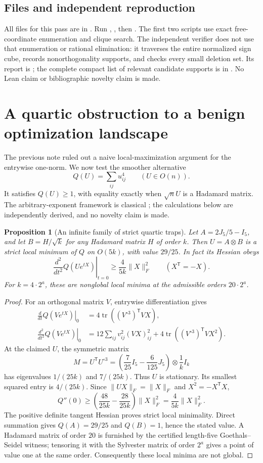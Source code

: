 \documentclass[11pt]{article}
\newtheorem{proposition}{Proposition}[section]
\begin{document}
\subsection{Files and independent reproduction}
All files for this pass are in .
Run , , then .
The first two scripts use exact free-coordinate enumeration and clique
search. The independent verifier does not use that enumeration or
rational elimination: it traverses the entire normalized sign cube,
records nonorthogonality supports, and checks every small deletion set.
Its report is ; the complete compact list of
relevant candidate supports is in .
No Lean claim or bibliographic novelty claim is made.
\section{A quartic obstruction to a benign optimization landscape}
The previous note ruled out a naive local-maximization argument for
the entrywise one-norm. We now test the smoother alternative
\[
 Q(U)=\sum_{ij}u_{ij}^4\qquad(U\in O(n)).
\]
It satisfies $Q(U)\ge1$, with equality exactly when $\sqrt nU$ is a
Hadamard matrix. The arbitrary-exponent framework is classical
\cite{ArbitraryP}; the calculations below are independently derived,
and no novelty claim is made.

\begin{proposition}[An infinite family of strict quartic traps]
Let $A=2J_5/5-I_5$, and let $B=H/\sqrt k$ for any Hadamard matrix
$H$ of order $k$. Then $U=A\otimes B$ is a strict local minimum of
$Q$ on $O(5k)$, with value $29/25$. In fact its Hessian obeys
\[
 \left.\frac{d^2}{dt^2}Q(Ue^{tX})\right|_{t=0}
 \ge\frac4{5k}\|X\|_F^2
 \qquad(X^{\mathsf T}=-X).
\]
For $k=4\cdot2^a$, these are nonglobal local minima at the admissible
orders $20\cdot2^a$.
\end{proposition}
\begin{proof}
For an orthogonal matrix $V$, entrywise differentiation gives
\begin{align*}
 \left.\frac{d}{dt}Q(Ve^{tX})\right|_{0}
 &=4\operatorname{tr}((V^{\circ3})^{\mathsf T}VX),\\
 \left.\frac{d^2}{dt^2}Q(Ve^{tX})\right|_{0}
 &=12\sum_{ij}v_{ij}^2(VX)_{ij}^2
   +4\operatorname{tr}((V^{\circ3})^{\mathsf T}VX^2).
\end{align*}
At the claimed $U$, the symmetric matrix
\[
 M=U^{\mathsf T}U^{\circ3}
  =\left(\frac7{25}I_5-\frac6{125}J_5\right)\otimes\frac1kI_k
\]
has eigenvalues $1/(25k)$ and $7/(25k)$. Thus $U$ is stationary.
Its smallest squared entry is $4/(25k)$. Since
$\|UX\|_F=\|X\|_F$ and $X^2=-X^{\mathsf T}X$,
\[
 Q''(0)\ge\left(\frac{48}{25k}-\frac{28}{25k}\right)\|X\|_F^2
 =\frac4{5k}\|X\|_F^2.
\]
The positive definite tangent Hessian proves strict local minimality.
Direct summation gives $Q(A)=29/25$ and $Q(B)=1$, hence the stated
value. A Hadamard matrix of order $20$ is furnished by the certified
length-five Goethals--Seidel witness; tensoring it with the Sylvester
matrix of order $2^a$ gives a point of value one at the same order.
Consequently these local minima are not global.
\end{proof}
\end{document}
